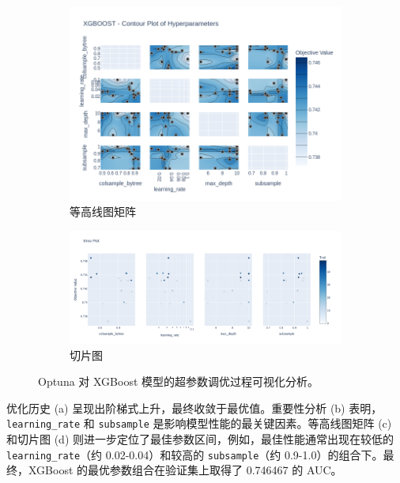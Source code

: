 \documentclass{thuemp}
\begin{document}
\begin{figure}[H]
    \vspace{0.5cm}

    \begin{subfigure}[b]{0.49\textwidth}
        \centering
        \includegraphics[width=\textwidth]{image/results/xgboost_contour_plot.png} %
        \caption{等高线图矩阵}
        \label{fig:xgb_contour}
    \end{subfigure}
    \hfill
    \begin{subfigure}[b]{0.49\textwidth}
        \centering
        \includegraphics[width=\textwidth]{image/results/xgboost_param_vs_target_slice.png} %
        \caption{切片图}
        \label{fig:xgb_slice}
    \end{subfigure}
    
    \caption{Optuna 对 XGBoost 模型的超参数调优过程可视化分析。}
    \label{fig:optuna_xgboost}
\end{figure}
优化历史 (a) 呈现出阶梯式上升，最终收敛于最优值。重要性分析 (b) 表明，\texttt{learning\_rate} 和 \texttt{subsample} 是影响模型性能的最关键因素。等高线图矩阵 (c) 和切片图 (d) 则进一步定位了最佳参数区间，例如，最佳性能通常出现在较低的 \texttt{learning\_rate}（约 0.02-0.04）和较高的 \texttt{subsample}（约 0.9-1.0）的组合下。最终，XGBoost 的最优参数组合在验证集上取得了 0.746467 的 AUC。
\end{document}
